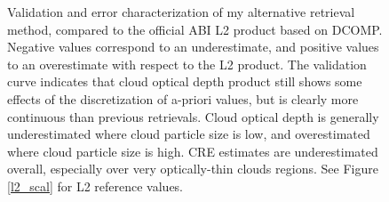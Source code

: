 \documentclass[12pt]{article}
\begin{document}
\begin{figure}[h!]
\begin{center}
{        }
    \end{center}
    \caption{Validation and error characterization of my alternative retrieval method, compared to the official ABI L2 product based on DCOMP. Negative values correspond to an underestimate, and positive values to an overestimate with respect to the L2 product. The validation curve indicates that cloud optical depth product still shows some effects of the discretization of a-priori values, but is clearly more continuous than previous retrievals. Cloud optical depth is generally underestimated where cloud particle size is low, and overestimated where cloud particle size is high. CRE estimates are underestimated overall, especially over very optically-thin clouds regions. See Figure \ref{l2_scal} for L2 reference values.}
    \label{brute}
\end{figure}
\end{document}
